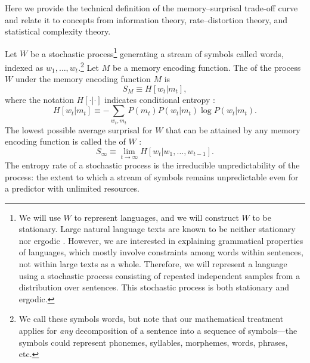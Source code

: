 Here we provide the technical definition of the memory--surprisal trade-off curve and relate it to concepts from information theory, rate--distortion theory, and statistical complexity theory.

Let $W$ be a stochastic process\footnote{We will use $W$ to represent languages, and we will construct $W$ to be stationary. Large natural language texts are known to be neither stationary nor ergodic \citep{debowski}. However, we are interested in explaining grammatical properties of languages, which mostly involve constraints among words within sentences, not within large texts as a whole. Therefore, we will represent a language using a stochastic process consisting of repeated independent samples from a distribution over sentences. This stochastic process is both stationary and ergodic.} generating a stream of symbols called words, indexed as $w_1, \dots, w_t$.\footnote{We call these symbols words, but note that our mathematical treatment applies for \emph{any} decomposition of a sentence into a sequence of symbols---the symbols could represent phonemes, syllables, morphemes, words, phrases, etc.} Let $M$ be a memory encoding function. The  of the process $W$ under the memory encoding function $M$ is
\begin{equation}
    S_M \equiv H[w_t | m_t],
\end{equation}
where the notation $H[\cdot | \cdot]$ indicates conditional entropy \citep[][p. 17]{cover2006elements}:
\begin{equation}
    H[w_t|m_t] \equiv -\sum_{w_t,m_t} P(m_t) P(w_t|m_t) \log P(w_t|m_t).
\end{equation}
The lowest possible average surprisal for $W$ that can be attained by any memory encoding function is called the  of $W$ \citep[][pp. 74--75]{cover2006elements}:
\begin{equation}
    \label{eq:entropy-rate}
    S_\infty \equiv \lim_{t \rightarrow \infty} H[w_t | w_1, \dots, w_{t-1}].
\end{equation}
 The entropy rate of a stochastic process is the irreducible unpredictability of the process: the extent to which a stream of symbols remains unpredictable even for a predictor with unlimited resources. 
